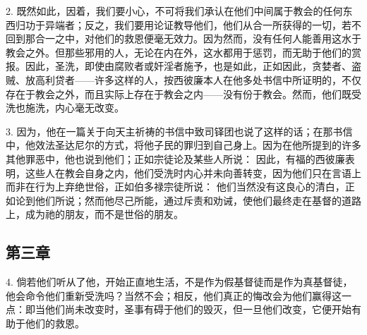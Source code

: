 2. 既然如此，因着，我们要小心，不可将我们承认在他们中间属于教会的任何东西归功于异端者；反之，我们要用论证教导他们，他们从合一所获得的一切，若不回到那合一之中，对他们的救恩便毫无效力。因为然而，没有任何人能善用这水于教会之外。但那些邪用的人，无论在内在外，这水都用于惩罚，而无助于他们的赏报。因此，圣洗，即使由腐败者或奸淫者施予，也是如此，正如因此，贪婪者、盗贼、放高利贷者——许多这样的人，按西彼廉本人在他多处书信中所证明的，不仅存在于教会之外，而且实际上存在于教会之内——没有份于教会。然而，他们既受洗也施洗，内心毫无改变。\par

3. 因为，他在一篇关于向天主祈祷的书信中致司铎团也说了这样的话；在那书信中，他效法圣达尼尔的方式，将他子民的罪归到自己身上。因为在他所提到的许多其他罪恶中，他也说到他们；正如宗徒论及某些人所说： 因此，有福的西彼廉表明，这些人在教会自身之内，他们受洗时内心并未向善转变，因为他们只在言语上而非在行为上弃绝世俗，正如伯多禄宗徒所说： 他们当然没有这良心的清白，正如论到他们所说；然而他尽己所能，通过斥责和劝诫，使他们最终走在基督的道路上，成为祂的朋友，而不是世俗的朋友。\par


\subsection{第三章}

4. 倘若他们听从了他，开始正直地生活，不是作为假基督徒而是作为真基督徒，他会命令他们重新受洗吗？当然不会；相反，他们真正的悔改会为他们赢得这一点：即当他们尚未改变时，圣事有碍于他们的毁灭，但一旦他们改变，它便开始有助于他们的救恩。\par

